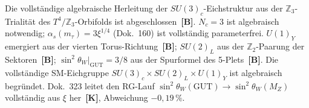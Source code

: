 \begin{keyresult}
Die vollständige algebraische Herleitung der $SU(3)_c$-Eichstruktur
aus der $\mathbb{Z}_3$-Trialität des $T^4/\mathbb{Z}_3$-Orbifolds
ist abgeschlossen~\textbf{[B]}. $N_c = 3$ ist algebraisch notwendig;
$\alpha_s(m_\tau) = 3\xi^{1/4}$ (Dok.~160) ist vollständig
parameterfrei. $U(1)_Y$ emergiert aus der vierten Torus-Richtung~\textbf{[B]};
$SU(2)_L$ aus der $\mathbb{Z}_2$-Paarung der Sektoren~\textbf{[B]};
$\sin^2\theta_W|_{\mathrm{GUT}} = 3/8$ aus der Spurformel des
5-Plets~\textbf{[B]}. Die vollständige SM-Eichgruppe
$SU(3)_c\times SU(2)_L\times U(1)_Y$ ist algebraisch begründet.
Dok.~323 leitet den RG-Lauf $\sin^2\theta_W(\mathrm{GUT})\to\sin^2\theta_W(M_Z)$
vollständig aus $\xi$ her~\textbf{[K]}, Abweichung $-0{,}19\,\%$.
\end{keyresult}
